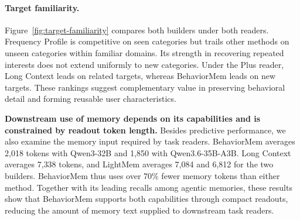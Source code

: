 \documentclass[sigconf,nonacm,balance=false]{acmart}
\begin{document}
\paragraph{\textbf{Target familiarity.}}
\label{sec:target-familiarity-analysis}
Figure~\ref{fig:target-familiarity} compares both builders under both readers. Frequency Profile is competitive on seen categories but trails other methods on unseen categories within familiar domains. Its strength in recovering repeated interests does not extend uniformly to new categories. Under the Plus reader, Long Context leads on related targets, whereas BehaviorMem leads on new targets. These rankings suggest complementary value in preserving behavioral detail and forming reusable user characteristics.



\textbf{Downstream use of memory depends on its capabilities and is constrained by readout token length.} Besides predictive performance, we also examine the memory input required by task readers. BehaviorMem averages 2{,}018 tokens with Qwen3-32B and 1{,}850 with Qwen3.6-35B-A3B. Long Context averages 7{,}338 tokens, and LightMem averages 7{,}084 and 6{,}812 for the two builders. BehaviorMem thus uses over 70\% fewer memory tokens than either method. Together with its leading recalls among agentic memories, these results show that BehaviorMem supports both capabilities through compact readouts, reducing the amount of memory text supplied to downstream task readers.
\end{document}

